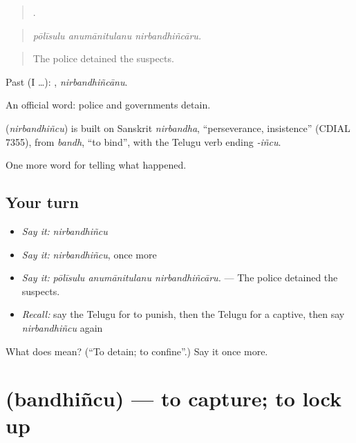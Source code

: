 \begin{quote}
  .
\end{quote}

\begin{quote}
\emph{pōlīsulu anumānitulanu nirbandhiñcāru.}
\end{quote}

\begin{quote}
The police detained the suspects.
\end{quote}

Past (I …): , \emph{nirbandhiñcānu}.

An official word: police and governments detain.

\begin{cousinweb}
\textbf{} (\emph{nirbandhiñcu}) is built on Sanskrit \emph{nirbandha}, \textquotedblleft{}perseverance, insistence\textquotedblright{} (CDIAL 7355), from \emph{bandh}, \textquotedblleft{}to bind\textquotedblright{}, with the Telugu verb ending \emph{-iñcu}.
\end{cousinweb}

\begin{grammarlens}[title={What you've built}]
One more word for telling what happened.
\end{grammarlens}

\subsection*{Your turn}
\begin{itemize}
\raggedright
  \item \emph{Say it:} \emph{nirbandhiñcu}
  \item \emph{Say it:} \emph{nirbandhiñcu}, once more
  \item \emph{Say it:} \emph{pōlīsulu anumānitulanu nirbandhiñcāru.} — The police detained the suspects.
  \item \emph{Recall:} say the Telugu for to punish, then the Telugu for a captive, then say \emph{nirbandhiñcu} again
\end{itemize}

\begin{tcolorbox}[breakable,colback=teal!4,colframe=teal!35!black,title={Before you move on}]
What does  mean? (\textquotedblleft{}To detain; to confine\textquotedblright{}.) Say it once more.
\end{tcolorbox}
\section[\texorpdfstring{\te{బంధించు} (bandhiñcu)}{బంధించు (bandhiñcu)}]{ (bandhiñcu) — to capture; to lock up}

